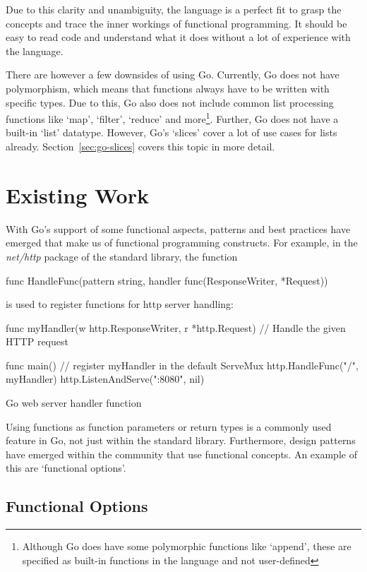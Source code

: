 Due to this clarity and unambiguity, the language is a perfect fit to grasp the concepts and trace
the inner workings of functional programming. It should be easy to read code and understand what
it does without a lot of experience with the language.

There are however a few downsides of using Go. Currently, Go does not have polymorphism, which means
that functions always have to be written with specific types. Due to this, Go also does not include
common list processing functions like `map', `filter', `reduce' and more\footnote{Although Go does
	have some polymorphic functions like `append', these are specified as built-in functions in the
language and not user-defined}. Further, Go does not have a built-in `list' datatype. However, Go's
`slices' cover a lot of use cases for lists already. Section~\ref{sec:go-slices} covers this topic
in more detail.

\section{Existing Work}

With Go's support of some functional aspects, patterns and best practices have emerged that make
us of functional programming constructs.
For example, in the \textit{net/http} package of the standard library, the function
\begin{gocode}
func HandleFunc(pattern string, handler func(ResponseWriter, *Request))
\end{gocode}
is used to register functions for http server handling\autocite{go-http-doc}:

\begin{code}
\begin{gocode}
func myHandler(w http.ResponseWriter, r *http.Request) {
    // Handle the given HTTP request
}

func main() {
    // register myHandler in the default ServeMux
    http.HandleFunc("/", myHandler)
    http.ListenAndServe(":8080", nil)
}
\end{gocode}
\caption{Go web server handler function}
\end{code}

Using functions as function parameters or return types is a commonly used feature in Go, not just
within the standard library. Furthermore, design patterns have emerged within the community
that use functional concepts. An example of this are `functional options'.

\subsection{Functional Options}


